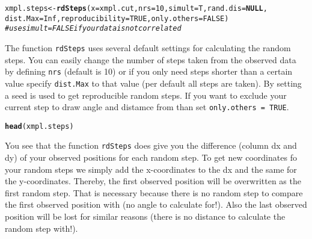 \documentclass[11pt, a4paper]{article}\usepackage[]{graphicx}\usepackage[]{color}
\makeatletter
\newcommand{\hlnum}[1]{\textcolor[rgb]{0.686,0.059,0.569}{#1}}%
\newcommand{\hlcom}[1]{\textcolor[rgb]{0.678,0.584,0.686}{\textit{#1}}}%
\newcommand{\hlstd}[1]{\textcolor[rgb]{0.345,0.345,0.345}{#1}}%
\newcommand{\hlkwa}[1]{\textcolor[rgb]{0.161,0.373,0.58}{\textbf{#1}}}%
\newcommand{\hlkwb}[1]{\textcolor[rgb]{0.69,0.353,0.396}{#1}}%
\newcommand{\hlkwc}[1]{\textcolor[rgb]{0.333,0.667,0.333}{#1}}%
\newcommand{\hlkwd}[1]{\textcolor[rgb]{0.737,0.353,0.396}{\textbf{#1}}}%
\newenvironment{kframe}{%
 \def\at@end@of@kframe{}%
 \ifinner\ifhmode%
  \def\at@end@of@kframe{\end{minipage}}%
  \begin{minipage}{\columnwidth}%
 \fi\fi%
 \def\FrameCommand##1{\hskip\@totalleftmargin \hskip-\fboxsep
 \colorbox{shadecolor}{##1}\hskip-\fboxsep
     \hskip-\linewidth \hskip-\@totalleftmargin \hskip\columnwidth}%
 \MakeFramed {\advance\hsize-\width
   \@totalleftmargin\z@ \linewidth\hsize
   \@setminipage}}%
 {\par\unskip\endMakeFramed%
 \at@end@of@kframe}
\newenvironment{knitrout}{}{} %
\makeatother
\begin{document}
\begin{knitrout}
\color{fgcolor}\begin{kframe}
\begin{alltt}
\hlstd{xmpl.steps} \hlkwb{<-} \hlkwd{rdSteps}\hlstd{(}\hlkwc{x} \hlstd{= xmpl.cut,} \hlkwc{nrs} \hlstd{=} \hlnum{10}\hlstd{,} \hlkwc{simult} \hlstd{= T,} \hlkwc{rand.dis} \hlstd{=} \hlkwa{NULL}\hlstd{,}
                      \hlkwc{dist.Max} \hlstd{=} \hlnum{Inf}\hlstd{,} \hlkwc{reproducibility} \hlstd{=} \hlnum{TRUE}\hlstd{,} \hlkwc{only.others} \hlstd{=} \hlnum{FALSE}\hlstd{)}
          \hlcom{# use simult = FALSE if your data is not correlated}
\end{alltt}
\end{kframe}
\end{knitrout}

The function \texttt{rdSteps} uses several default settings for calculating the random steps. You can easily change the number of steps taken from the observed data by defining \texttt{nrs} (default is 10) or if you only need steps shorter than a certain value specify \texttt{dist.Max} to that value (per default all steps are taken). By setting  a seed is used to get reproducible random steps. If you want to exclude your current step to draw angle and distamce from than set \texttt{only.others = TRUE}. 


\begin{knitrout}
\color{fgcolor}\begin{kframe}
\begin{alltt}
\hlkwd{head}\hlstd{(xmpl.steps)}
\end{alltt}


{\ttfamily\noindent\bfseries\color{errorcolor}{\#\# Error in head(xmpl.steps): object 'xmpl.steps' not found}}\end{kframe}
\end{knitrout}

You see that the function \texttt{rdSteps} does give you the difference (column dx and dy) of your observed positions for each random step. To get new coordinates fo your random steps we simply add the x-coordinates to the dx and the same for the y-coordinates. Thereby, the first observed position will be overwritten as the first random step. That is necessary because there is no random step to compare the first observed position with (no angle to calculate for!). Also the last observed position will be lost for similar reasons (there is no distance to calculate the random step with!).
\end{document}
